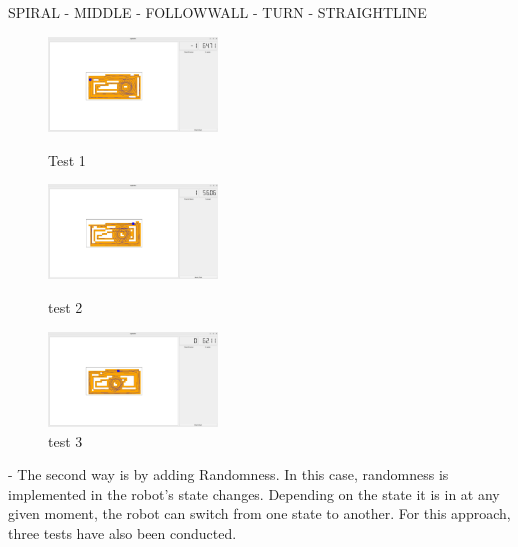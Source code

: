 \documentclass[conference]{IEEEtran}
\begin{document}
    SPIRAL - MIDDLE - FOLLOWWALL - TURN - STRAIGHTLINE

\begin{figure}
  \centering
  \includegraphics[width=0.4\textwidth]{test1sin.jpg}
  \caption{Test 1}
  \label{fig:Test 1 sin aleatoriedad}

  \vspace{1.0 cm}
  
  \centering
  \includegraphics[width=0.4\textwidth]{test2sin.jpg}
  \caption{test 2}
  \label{fig:Test 2 sin aleatoriedad}

  \vspace{1.0 cm}

  \centering
  \includegraphics[width=0.4\textwidth]{test3sin.jpg}
  \caption{test 3}
  \label{fig:Test 3 sin aleatoriedad}
  
\end{figure}

\vspace{10.0 cm}


- The second way is by adding Randomness. In this case, randomness is implemented in the robot's state changes. Depending on the state it is in at any given moment, the robot can switch from one state to another. For this approach, three tests have also been conducted.

\vspace{3.0 cm}
\end{document}

